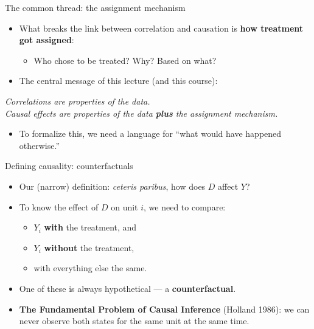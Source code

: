 \documentclass[
  11pt,
  ignorenonframetext,
  aspectratio=169,
]{beamer}
\providecommand{\tightlist}{%
  \setlength{\itemsep}{0pt}\setlength{\parskip}{0pt}}
\begin{document}
\begin{frame}{The common thread: the assignment mechanism}
\protect{}\label{the-common-thread-the-assignment-mechanism}
\begin{itemize}
\tightlist
\item
  What breaks the link between correlation and causation is \textbf{how
  treatment got assigned}:

  \begin{itemize}
  \tightlist
  \item
    Who chose to be treated? Why? Based on what?
  \end{itemize}
\item
  The central message of this lecture (and this course):
\end{itemize}

\begin{center}
\emph{Correlations are properties of the data.\\
Causal effects are properties of the data \textbf{plus} the assignment mechanism.}
\end{center}

\begin{itemize}
\tightlist
\item
  To formalize this, we need a language for ``what would have happened
  otherwise.''
\end{itemize}
\end{frame}

\begin{frame}{Defining causality: counterfactuals}
\protect{}\label{defining-causality-counterfactuals}
\begin{itemize}
\tightlist
\item
  Our (narrow) definition: \emph{ceteris paribus}, how does \(D\) affect
  \(Y\)?
\item
  To know the effect of \(D\) on unit \(i\), we need to compare:

  \begin{itemize}
  \tightlist
  \item
    \(Y_i\) \textbf{with} the treatment, and
  \item
    \(Y_i\) \textbf{without} the treatment,
  \item
    with everything else the same.
  \end{itemize}
\item
  One of these is always hypothetical --- a \textbf{counterfactual}.
\item
  \textbf{The Fundamental Problem of Causal Inference} (Holland 1986):
  we can never observe both states for the same unit at the same time.
\end{itemize}
\end{frame}
\end{document}
